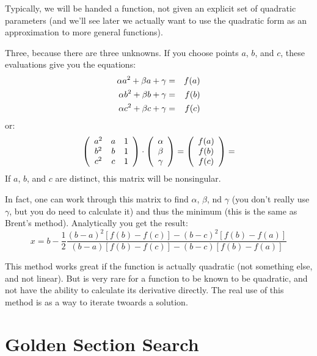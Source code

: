 Typically, we will be handed a function, not given an explicit set of
quadratic parameters (and we'll see later we actually want to
use the quadratic form as an approximation to more general
functions). 


\begin{answer}
Three, because there are three unknowns. If you choose points $a$,
$b$, and $c$, these evaluations give you the equations:
\begin{eqnarray}
\alpha a^2 + \beta a + \gamma &=& f(a) \cr
\alpha b^2 + \beta b + \gamma &=& f(b) \cr
\alpha c^2 + \beta c + \gamma &=& f(c) \cr
\end{eqnarray}
or:
\begin{equation}
  \left(\begin{array}{ccc}
    a^2 & a & 1 \cr
    b^2 & b & 1 \cr
    c^2 & c & 1 
  \end{array}\right) \cdot
  \left(\begin{array}{c}
    \alpha \cr
    \beta \cr
    \gamma
    \end{array}\right) = 
  \left(\begin{array}{c}
    f(a) \cr
    f(b) \cr
    f(c)
    \end{array}\right) = 
\end{equation}
If $a$, $b$, and $c$ are distinct, this matrix will be nonsingular.
\end{answer}

In fact, one can work through this matrix to find $\alpha$, $\beta$,
nd $\gamma$ (you don't really use $\gamma$, but you do need to
calculate it) and thus the minimum (this is the same as Brent's
method). Analytically you get the result:
\begin{equation}
  x = b - \frac{1}{2}
  \frac{(b-a)^2 \left[f(b) - f(c)\right] - (b-c)^2
  \left[f(b) - f(a)\right]}
  {(b-a) \left[f(b) - f(c)\right] - (b-c) \left[f(b) - f(a)\right]}
\end{equation}

This method works great if the function is actually quadratic (not
something else, and not linear). But is very rare for a function to be
known to be quadratic, and not have the ability to calculate its
derivative directly. The real use of this method is as a way to
iterate twoards a solution.

\section{Golden Section Search}

